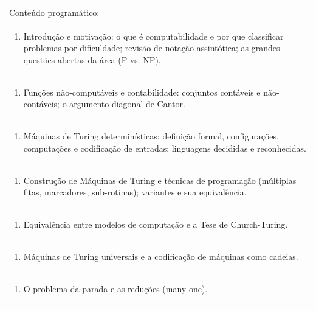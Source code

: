 \documentclass[11pt]{article}
\begin{document}
\begin{center}
\begin{longtable}{|p{4cm}|p{4cm}|p{4cm}|p{4cm}|}
\hline
\multicolumn{4}{|p{16cm}|}{Conteúdo programático:}\\*
\multicolumn{4}{|p{\dimexpr 16cm + 6\tabcolsep\relax}|}{\begin{enumerate}[start=1]\item Introdução e motivação: o que é computabilidade e por que classificar problemas por dificuldade; revisão de notação assintótica; as grandes questões abertas da área (P vs. NP).\end{enumerate}}\\
\multicolumn{4}{|p{\dimexpr 16cm + 6\tabcolsep\relax}|}{\begin{enumerate}[start=2]\item Funções não-computáveis e contabilidade: conjuntos contáveis e não-contáveis; o argumento diagonal de Cantor.\end{enumerate}}\\
\multicolumn{4}{|p{\dimexpr 16cm + 6\tabcolsep\relax}|}{\begin{enumerate}[start=3]\item Máquinas de Turing determinísticas: definição formal, configurações, computações e codificação de entradas; linguagens decididas e reconhecidas.\end{enumerate}}\\
\multicolumn{4}{|p{\dimexpr 16cm + 6\tabcolsep\relax}|}{\begin{enumerate}[start=4]\item Construção de Máquinas de Turing e técnicas de programação (múltiplas fitas, marcadores, sub-rotinas); variantes e sua equivalência.\end{enumerate}}\\
\multicolumn{4}{|p{\dimexpr 16cm + 6\tabcolsep\relax}|}{\begin{enumerate}[start=5]\item Equivalência entre modelos de computação e a Tese de Church-Turing.\end{enumerate}}\\
\multicolumn{4}{|p{\dimexpr 16cm + 6\tabcolsep\relax}|}{\begin{enumerate}[start=6]\item Máquinas de Turing universais e a codificação de máquinas como cadeias.\end{enumerate}}\\
\multicolumn{4}{|p{\dimexpr 16cm + 6\tabcolsep\relax}|}{\begin{enumerate}[start=7]\item O problema da parada e as reduções (many-one).\end{enumerate}}\\

\end{longtable}
\end{center}
\end{document}
